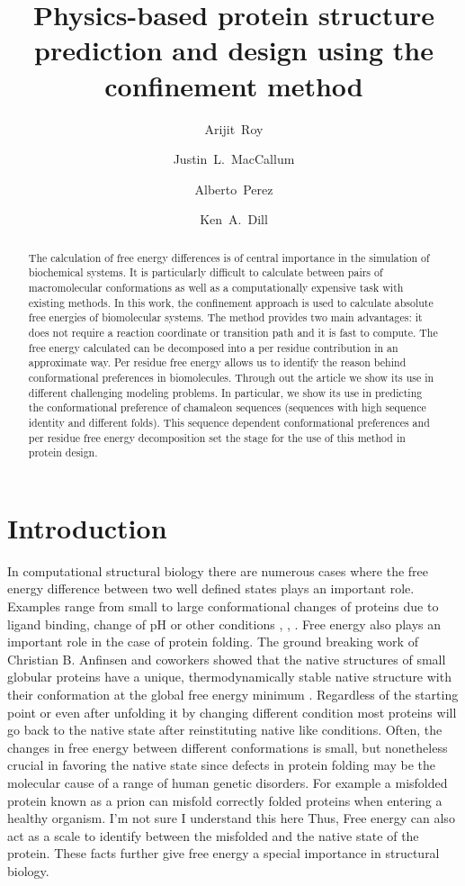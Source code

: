 \documentclass[12pt]{article}
\author{Arijit~Roy}
\author{Justin~L.~MacCallum}
\author{Alberto~Perez}
\author{Ken~A.~Dill}
\affil{Laufer Center for Physical and Quantitative Biology\\
    Stony Brook University\\
    Stony Brook, NY 11794-5252.}
\title{Physics-based protein structure prediction and design using the confinement method}
\newcommand{\Alberto}[1]{\color{ForestGreen}#1\normalcolor }
\newcommand{\Arijit}[1]{\color{yellow}#1\normalcolor}
\begin{document}
\maketitle

\begin{abstract}

The calculation of free energy differences is of central importance in the simulation of biochemical
systems. It is particularly difficult to calculate between pairs of macromolecular
conformations as well as a computationally expensive task with existing
methods. In this work, the confinement approach is used to calculate absolute
free energies of biomolecular systems. The method provides two main advantages: it does not require a reaction coordinate or
transition path and it is fast to compute. The free energy calculated can be decomposed into a per
residue contribution in an 
approximate way. Per residue free energy allows us
to identify the reason behind conformational preferences in biomolecules. Through out the article we show its use in different
challenging modeling problems. In particular, we show its use in predicting the conformational
preference of chamaleon sequences (sequences with high sequence identity and different
folds). This sequence dependent conformational preferences and per residue free energy decomposition set the stage for the use of this 
method in protein design. 

\end{abstract}


\section{Introduction}

In computational structural biology there are numerous cases where the free energy difference
between two well defined 
states plays an important role. Examples range from small to large conformational changes of proteins due to
ligand binding, change of pH or other conditions \cite{Meirovitch2007}, \cite{Chipot2007}, \cite{Jorgensen2004}. 
Free energy also plays an important role in the case of protein
folding. The ground breaking work of Christian B. Anfinsen and coworkers showed that the native
structures of small globular proteins have a unique, thermodynamically stable native structure with
their conformation at the global free energy minimum \cite{Anfinsen1973}. Regardless of the starting
point or even after unfolding 
it by changing different condition most proteins will go back to the native state after
reinstituting native like conditions. Often, the changes in free energy between different
conformations is small, but nonetheless crucial in favoring the native state
 since defects in protein folding may be
the molecular cause of a range of human genetic disorders. For example a misfolded protein known as
a
prion can misfold correctly folded proteins when entering a healthy organism.
\Alberto{I'm not sure I understand this here} \Arijit{Thus, Free energy can also act as a scale to identify between the misfolded and the native state of
the protein.} These facts further give free energy a special importance in structural biology.
\end{document}

